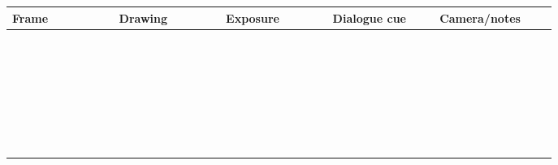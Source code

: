 \documentclass[10pt,letterpaper]{article}
\begin{document}
\begin{longtable}{|p{0.156\linewidth}|p{0.156\linewidth}|p{0.156\linewidth}|p{0.156\linewidth}|p{0.156\linewidth}|}
\hline
\textbf{Frame} & \textbf{Drawing} & \textbf{Exposure} & \textbf{Dialogue cue} & \textbf{Camera/notes}\\\hline
\endhead
\rule{0pt}{20pt} &  &  &  & \\\hline
\rule{0pt}{20pt} &  &  &  & \\\hline
\rule{0pt}{20pt} &  &  &  & \\\hline
\rule{0pt}{20pt} &  &  &  & \\\hline
\rule{0pt}{20pt} &  &  &  & \\\hline
\rule{0pt}{20pt} &  &  &  & \\\hline
\rule{0pt}{20pt} &  &  &  & \\\hline
\rule{0pt}{20pt} &  &  &  & \\\hline
\rule{0pt}{20pt} &  &  &  & \\\hline
\rule{0pt}{20pt} &  &  &  & \\\hline
\rule{0pt}{20pt} &  &  &  & \\\hline
\rule{0pt}{20pt} &  &  &  & \\\hline
\rule{0pt}{20pt} &  &  &  & \\\hline
\rule{0pt}{20pt} &  &  &  & \\\hline
\rule{0pt}{20pt} &  &  &  & \\\hline
\rule{0pt}{20pt} &  &  &  & \\\hline
\rule{0pt}{20pt} &  &  &  & \\\hline
\rule{0pt}{20pt} &  &  &  & \\\hline
\rule{0pt}{20pt} &  &  &  & \\\hline
\rule{0pt}{20pt} &  &  &  & \\\hline
\rule{0pt}{20pt} &  &  &  & \\\hline
\rule{0pt}{20pt} &  &  &  & \\\hline
\rule{0pt}{20pt} &  &  &  & \\\hline
\rule{0pt}{20pt} &  &  &  & \\\hline
\rule{0pt}{20pt} &  &  &  & \\\hline
\rule{0pt}{20pt} &  &  &  & \\\hline
\rule{0pt}{20pt} &  &  &  & \\\hline
\rule{0pt}{20pt} &  &  &  & \\\hline
\rule{0pt}{20pt} &  &  &  & \\\hline
\rule{0pt}{20pt} &  &  &  & \\\hline

\end{longtable}
\end{document}
